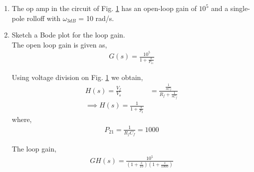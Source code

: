 \begin{enumerate}[label=\thesection.\arabic*.,ref=\thesection.\theenumi]
\item The op amp in the circuit of Fig. \ref{fig:ee18btech11028_2_q}
has an open-loop gain of $10^{5}$ and a single-pole rolloff with
$\omega_{3dB}$ = 10 rad/s.

\renewcommand{\thefigure}{\theenumi.\arabic{figure}}
%
\begin{figure}[!ht]
	\begin{center}
		\resizebox{\columnwidth}{!}{}
	\end{center}
\caption{}
\label{fig:ee18btech11028_2_q}
\end{figure}
%
\begin{table}[!ht]
    \centering
    
    \caption{}
    \label{table:ee18btech11028_2_parameters}
\end{table}

\item Sketch a Bode plot for the loop gain.
\\
\solution
The open loop gain is given as,
\begin{align}
    G(s) = \frac{10^5}{1 + \frac{s}{P_{11}}}
        \label{eq:ee18btech11028_2_2}
\end{align}

Using voltage division on Fig. \ref{fig:ee18btech11028_2_q} we obtain,
\begin{align}
    H(s) = \frac{V_{f}}{V_{o}}
     &= \frac{\frac{1}{sC_{f}}}{R_{f} + \frac{1}{sC_{f}}}
    \\
    \implies H(s) = \frac{1}{1 + \frac{s}{P_{2}}}
        \label{eq:ee18btech11028_2_1}
\end{align}
where, 
\begin{align}
    P_{21} = \frac{1}{R_{f}C_{f}} = 1000
\end{align}

The loop gain, 
\begin{align}
    GH(s) = \frac{10^5}{(1+\frac{s}{10})(1 + \frac{s}{1000})}
\end{align}


\end{enumerate}
